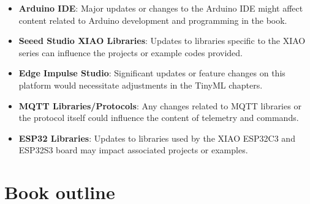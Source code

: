 \documentclass[
  letterpaper,
  DIV=11,
  numbers=noendperiod]{scrreprt}
\begin{document}

\begin{itemize}
\item
  \textbf{Arduino IDE}: Major updates or changes to the Arduino IDE
  might affect content related to Arduino development and programming in
  the book.
\item
  \textbf{Seeed Studio XIAO Libraries}: Updates to libraries specific to
  the XIAO series can influence the projects or example codes provided.
\item
  \textbf{Edge Impulse Studio}: Significant updates or feature changes
  on this platform would necessitate adjustments in the TinyML chapters.
\item
  \textbf{MQTT Libraries/Protocols}: Any changes related to MQTT
  libraries or the protocol itself could influence the content of
  telemetry and commands.
\item
  \textbf{ESP32 Libraries}: Updates to libraries used by the XIAO
  ESP32C3 and ESP32S3 board may impact associated projects or examples.
\end{itemize}

\hypertarget{book-outline}{%
\section*{Book outline}\label{book-outline}}

\end{document}
